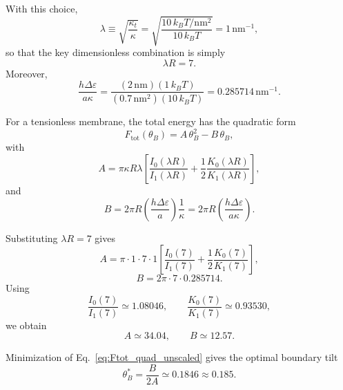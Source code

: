 \documentclass[11pt]{article}
\begin{document}
With this choice,
\begin{equation}
\lambda \equiv \sqrt{\frac{\kappa_t}{\kappa}}
= \sqrt{\frac{10\,k_B T/\mathrm{nm}^2}{10\,k_B T}}
= 1\,\mathrm{nm}^{-1},
\label{eq:lambda_unscaled}
\end{equation}
so that the key dimensionless combination is simply
\begin{equation}
\lambda R = 7.
\label{eq:lambdaR_unscaled}
\end{equation}
Moreover,
\begin{equation}
\frac{h\Delta\varepsilon}{a\kappa}
=
\frac{(2\,\mathrm{nm})(1\,k_B T)}
{(0.7\,\mathrm{nm}^2)(10\,k_B T)}
=
0.285714\,\mathrm{nm}^{-1}.
\label{eq:contact_ratio_unscaled}
\end{equation}

For a tensionless membrane, the total energy has the quadratic form
\begin{equation}
F_{\mathrm{tot}}(\theta_B)
=
A\,\theta_B^2 - B\,\theta_B,
\label{eq:Ftot_quad_unscaled}
\end{equation}
with
\begin{equation}
A
=
\pi \kappa R \lambda
\left[
\frac{I_0(\lambda R)}{I_1(\lambda R)}
+
\frac{1}{2}\frac{K_0(\lambda R)}{K_1(\lambda R)}
\right],
\label{eq:A_unscaled}
\end{equation}
and
\begin{equation}
B
=
2\pi R \left(\frac{h\Delta\varepsilon}{a}\right)\frac{1}{\kappa}
=
2\pi R \left(\frac{h\Delta\varepsilon}{a\kappa}\right).
\label{eq:B_unscaled}
\end{equation}

Substituting $\lambda R = 7$ gives
\begin{equation}
A
=
\pi \cdot 1 \cdot 7 \cdot 1
\left[
\frac{I_0(7)}{I_1(7)}
+
\frac{1}{2}\frac{K_0(7)}{K_1(7)}
\right],
\label{eq:A_eval_unscaled}
\end{equation}
\begin{equation}
B
=
2\pi \cdot 7 \cdot 0.285714.
\label{eq:B_eval_unscaled}
\end{equation}
Using
\begin{equation}
\frac{I_0(7)}{I_1(7)} \simeq 1.08046,
\qquad
\frac{K_0(7)}{K_1(7)} \simeq 0.93530,
\label{eq:bessel_ratios_unscaled}
\end{equation}
we obtain
\begin{equation}
A \simeq 34.04,
\qquad
B \simeq 12.57.
\label{eq:AB_values_unscaled}
\end{equation}

Minimization of Eq.~\eqref{eq:Ftot_quad_unscaled} gives the optimal boundary tilt
\begin{equation}
\theta_B^*
=
\frac{B}{2A}
\simeq 0.1846 \approx 0.185.
\label{eq:thetaBstar_unscaled}
\end{equation}
\end{document}

